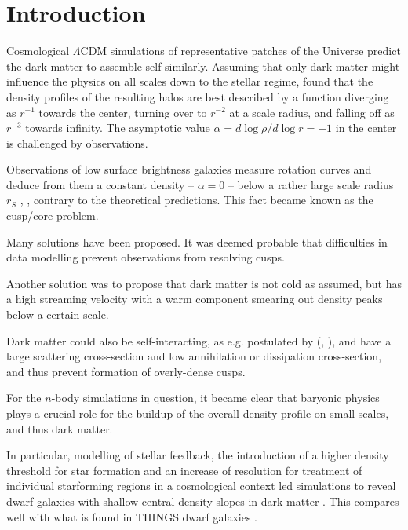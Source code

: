 
\section{Introduction}\label{sec:introduction}


Cosmological $\Lambda$CDM simulations of representative patches of the
Universe predict the dark matter to assemble self-similarly. Assuming
that only dark matter might influence the physics on all scales down
to the stellar regime, \citet{Navarro+1997} found that the density
profiles of the resulting halos are best described by a function
diverging as $r^{-1}$ towards the center, turning over to $r^{-2}$ at
a scale radius, and falling off as $r^{-3}$ towards infinity. The
asymptotic value $\alpha = d \log\rho/d \log r = -1$ in the center is
challenged by observations.

Observations of low surface brightness galaxies measure rotation
curves and deduce from them a constant density -- $\alpha=0$ -- below
a rather large scale radius $r_S$ ,
, contrary to the theoretical predictions. This
fact became known as the cusp/core problem.

Many solutions have been proposed. It was deemed probable that
difficulties in data modelling prevent observations from resolving
cusps. 

Another solution was to propose that dark matter is not cold as
assumed, but has a high streaming velocity with a warm component
smearing out density peaks below a certain scale.

Dark matter could also be self-interacting, as e.g. postulated by
(\citet{SpergelSteinhardt2000}, \citet{Vogelsberger+2012}), and have a
large scattering cross-section and low annihilation or dissipation
cross-section, and thus prevent formation of overly-dense cusps.


For the $n$-body simulations in question, it became clear that
baryonic physics plays a crucial role for the buildup of the overall
density profile on small scales, and thus dark matter.

In particular, modelling of stellar feedback, the introduction of a
higher density threshold for star formation and an increase of
resolution for treatment of individual starforming regions in a
cosmological context led simulations to reveal dwarf galaxies with
shallow central density slopes in dark matter
. This compares well with what is found in
THINGS dwarf galaxies .

